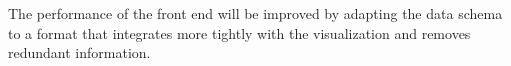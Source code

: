\documentclass[11pt]{scrartcl}
\begin{document}
The performance of the front end will be improved by adapting the data schema to a format that integrates more tightly with the visualization and removes redundant information.









\end{document}
